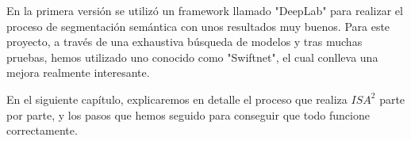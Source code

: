 En la primera versión se utilizó un framework llamado "DeepLab" para realizar el proceso de segmentación semántica con unos resultados muy buenos. Para este proyecto, a través de una exhaustiva búsqueda de modelos y tras muchas pruebas, hemos utilizado uno conocido como "Swiftnet", el cual conlleva una mejora realmente interesante.


En el siguiente capítulo, explicaremos en detalle el proceso que realiza $ISA^{2}$ parte por parte, y los pasos que hemos seguido para conseguir que todo funcione correctamente.







